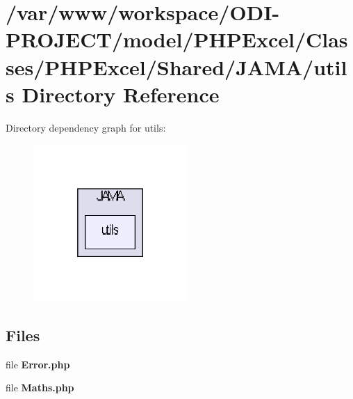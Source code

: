 \section{/var/www/workspace/\+O\+D\+I-\/\+P\+R\+O\+J\+E\+C\+T/model/\+P\+H\+P\+Excel/\+Classes/\+P\+H\+P\+Excel/\+Shared/\+J\+A\+M\+A/utils Directory Reference}
\label{dir_624fb323be66029a4d2efb77508f1c5a}
Directory dependency graph for utils\+:\nopagebreak
\begin{figure}[H]
\begin{center}
\leavevmode
\includegraphics[width=166pt]{dir_624fb323be66029a4d2efb77508f1c5a_dep}
\end{center}
\end{figure}
\subsection*{Files}
\begin{DoxyCompactItemize}
\item 
file {\bfseries Error.\+php}
\item 
file {\bfseries Maths.\+php}
\end{DoxyCompactItemize}
